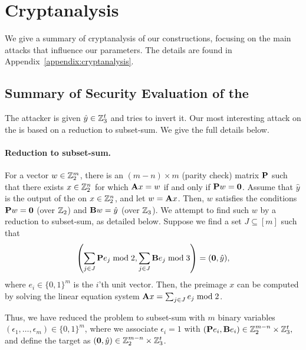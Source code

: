 \section{Cryptanalysis}
\label{sec:cryptanalysis}

\newcommand{\zerovec}{\textbf{0}}

We give a summary of cryptanalysis of our constructions,
focusing on the main attacks that influence our parameters.
The details are found in Appendix~\ref{appendix:cryptanalysis}.


\subsection{Summary of Security Evaluation of the \ttOWF}

The attacker is given $\hat{y} \in \mathbb{Z}_3^t$ and tries to invert it.
Our most interesting attack on the \ttOWF is based on a reduction to subset-sum.
We give the full details below.

\paragraph{Reduction to subset-sum.}
For a vector $w \in \mathbb{Z}_2^m$, there is an $(m -n) \times m$ (parity check) matrix $\mat{P}$ such that there exists $x \in \mathbb{Z}_2^n$ for which $\mat{A}x = w$ if and only if $\mat{P} w=\zerovec$.
Assume that $\hat{y}$ is the output of the \ttOWF on $x \in \mathbb{Z}_2^n$, and let $w = \mat{A}x$. Then,
$w$ satisfies the conditions $\mat{P} w = \zerovec$ (over $\mathbb{Z}_2$) and $\mat{B}w = \hat{y}$ (over $\mathbb{Z}_3$).
We attempt to find such $w$ by a reduction to subset-sum, as detailed below. Suppose we find a set $J \subseteq [m]$ such that
$$\left( \sum_{j \in J} \mat{P}e_j  \bmod 2, \sum_{j \in J} \mat{B}e_j  \bmod 3 \right) = (\zerovec,\hat{y}),$$
where $e_i \in \{0,1\}^m$ is the $i$'th unit vector.
Then, the preimage $x$ can be computed by solving the linear equation system
$\mat{A}x = \sum_{j \in J} e_j  \bmod 2$.

Thus, we have reduced the problem to subset-sum with $m$ binary variables
$(\epsilon_1, \ldots, \epsilon_m) \in \{0,1\}^m$, where we associate $\epsilon_i = 1$
with $(\mat{P}e_i, \mat{B}e_i) \in \Z_2^{m-n} \times \Z_3^t,$
and define the target
as $(\zerovec,\hat{y}) \in \Z_2^{m-n} \times \Z_3^t$.

